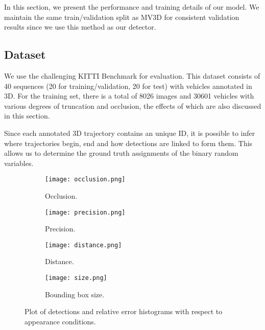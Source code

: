 \documentclass[letterpaper, 10 pt, conference]{ieeeconf}  \pdfminorversion=4
\begin{document}
In this section, we present the performance and training details of our model. We maintain the same train/validation split as MV3D \cite{mv3d} for consistent validation results since we use this method as our detector.



\subsection{Dataset}
We use the challenging KITTI Benchmark \cite{kitti} for evaluation. This dataset consists of 40 sequences (20 for training/validation, 20 for test) with vehicles annotated in 3D. For the training set, there is a total of 8026 images and 30601 vehicles with various degrees of truncation and occlusion, the effects of which are also discussed in this section.

Since each annotated 3D trajectory contains an unique ID, it is possible to infer where trajectories begin, end and how detections are linked to form them. This allows us to determine the ground truth assignments of the binary random variables.




\begin{figure*}[!htb]
\centering
  \begin{subfigure}[b]{0.35\textwidth}
    \texttt{[image: occlusion.png]}
    \caption{Occlusion.}
    \label{fig:occlusion_plot}
  \end{subfigure}
  \begin{subfigure}[b]{0.35\textwidth}
    \texttt{[image: precision.png]}
    \caption{Precision.}
    \label{fig:precision_plot}
  \end{subfigure}
  \begin{subfigure}[b]{0.35\textwidth}
    \texttt{[image: distance.png]}
    \caption{Distance.}
    \label{fig:distance_plot}
  \end{subfigure}
  \begin{subfigure}[b]{0.35\textwidth}
    \texttt{[image: size.png]}
    \caption{Bounding box size.}
    \label{fig:size_plot}
  \end{subfigure}
  \caption{Plot of detections and relative error histograms with respect to appearance conditions.}
  \label{fig:error_histograms}
\end{figure*}
\end{document}
